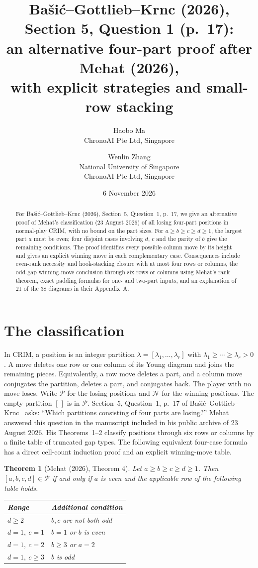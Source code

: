 \documentclass[11pt]{article}
\title{Ba\v{s}i\'c--Gottlieb--Krnc (2026), Section 5, Question 1 (p.~17):\\an alternative four-part proof after Mehat (2026),\\with explicit strategies and small-row stacking}
\author{Haobo Ma\\\small ChronoAI Pte Ltd, Singapore\and
Wenlin Zhang\\\small National University of Singapore\\\small ChronoAI Pte Ltd, Singapore}
\date{6 November 2026}
\newtheorem{theorem}{Theorem}
\newcommand{\PP}{\mathcal P}
\newcommand{\NN}{\mathcal N}
\begin{document}
\maketitle
\begin{abstract}
For Ba\v{s}i\'c--Gottlieb--Krnc (2026), Section~5, Question~1, p.~17,
we give an alternative proof of Mehat's classification (23 August 2026)
of all losing four-part positions in normal-play CRIM, with no bound
on the part sizes.
For $a\ge b\ge c\ge d\ge1$, the largest part $a$ must be even;
four disjoint cases involving $d$, $c$ and the parity of $b$ give the remaining conditions.
The proof identifies every possible column move by its height and gives
an explicit winning move in each complementary case.
Consequences include even-rank necessity and hook-stacking closure with at most
four rows or columns, the odd-gap winning-move conclusion through six rows
or columns using Mehat's rank theorem, exact padding formulas for one- and two-part inputs,
and an explanation of 21 of the 38 diagrams in their Appendix~A.
\end{abstract}

\section{The classification}
In CRIM, a position is an integer partition
$\lambda=[\lambda_1,\ldots,\lambda_r]$ with
$\lambda_1\ge\cdots\ge\lambda_r>0$.
A move deletes one row or one column of its Young diagram and joins the
remaining pieces. Equivalently, a row move deletes a part, and a column move
conjugates the partition, deletes a part, and conjugates back.
The player with no move loses. Write $\PP$ for the losing positions and
$\NN$ for the winning positions. The empty partition $[\,]$ is in $\PP$.
Section~5, Question~1, p.~17 of Ba\v{s}i\'c--Gottlieb--Krnc~\cite{BGK}
asks: ``Which partitions consisting of four parts are losing?''
Mehat~\cite[Theorem~4, p.~2; proof in Section~8, p.~9]{Mehat}
answered this question in the manuscript included in his public archive
of 23 August 2026. His Theorems~1--2 classify positions through six rows
or columns by a finite table of truncated gap types. The following
equivalent four-case formula has a direct cell-count induction proof
and an explicit winning-move table.

\begin{theorem}[Mehat (2026), Theorem 4]\label{thm:main}
Let $a\ge b\ge c\ge d\ge1$. Then $[a,b,c,d]\in\PP$ if and only if
$a$ is even and the applicable row of the following table holds.
\begin{center}
\begin{tabular}{ll}
\toprule
Range & Additional condition\\
\midrule
$d\ge2$ & $b,c$ are not both odd\\
$d=1,\ c=1$ & $b=1$ or $b$ is even\\
$d=1,\ c=2$ & $b\ge3$ or $a=2$\\
$d=1,\ c\ge3$ & $b$ is odd\\
\bottomrule
\end{tabular}
\end{center}
\end{theorem}
\end{document}
